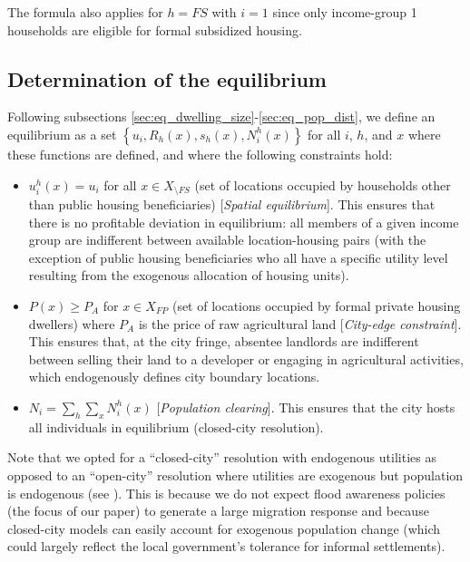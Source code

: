 \documentclass[12pt]{article}
\begin{document}
The formula also applies for $h=FS$ with $i=1$ since only income-group 1 households are eligible for formal subsidized housing.


\subsection{Determination of the equilibrium}

Following subsections \ref{sec:eq_dwelling_size}-\ref{sec:eq_pop_dist}, we define an equilibrium as a set $\left\{ u_i,R_h(x),s_h(x),N_i^h(x) \right\}$ for all $i$, $h$, and $x$ where these functions are defined, and where the following constraints hold:
\begin{itemize}
    \item[(i)] $u_i^h(x)=u_i$ for all $x \in X_{\setminus FS}$ (set of locations occupied by households other than public housing beneficiaries) [\textit{Spatial equilibrium}]. This ensures that there is no profitable deviation in equilibrium: all members of a given income group are indifferent between available location-housing pairs (with the exception of public housing beneficiaries who all have a specific utility level resulting from the exogenous allocation of housing units).
    \item[(ii)] $P(x) \geq P_A$ for $x \in X_{FP}$ (set of locations occupied by formal private housing dwellers) where $P_A$ is the price of raw agricultural land [\textit{City-edge constraint}]. This ensures that, at the city fringe, absentee landlords are indifferent between selling their land to a developer or engaging in agricultural activities, which endogenously defines city boundary locations.
    \item[(iii)] $N_i=\sum\limits_h\sum\limits_xN_i^h(x)$ [\textit{Population clearing}].  This ensures that the city hosts all individuals in equilibrium (closed-city resolution).
\end{itemize}

Note that we opted for a ``closed-city'' resolution with endogenous utilities as opposed to an ``open-city'' resolution where utilities are exogenous but population is endogenous (see \citet{Fujita1989UrbanSize}). This is because we do not expect flood awareness policies (the focus of our paper) to generate a large migration response and because closed-city models can easily account for exogenous population change (which could largely reflect  the local government's tolerance for informal settlements).
\end{document}
